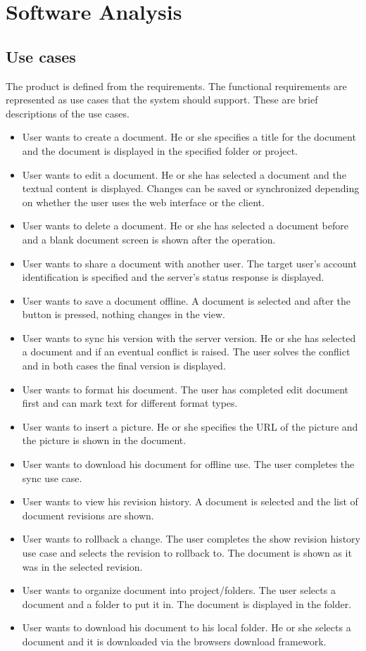 \documentclass[a4paper,11pt,report]{report}
\begin{document}
\newpage

\section{Software Analysis}
	\subsection{Use cases}
	The product is defined from the requirements. The functional requirements are represented as use cases that the system should support. These are brief descriptions of the use cases.
	\begin{itemize}
	\item User wants to create a document. He or she specifies a title for the document and the document is displayed in the specified folder or project.
	\item User wants to edit a document. He or she has selected a document and the textual content is displayed. Changes can be saved or synchronized depending on whether the user uses the web interface or the client.
	\item User wants to delete a document. He or she has selected a document before and a blank document screen is shown after the operation.
	\item User wants to share a document with another user. The target user's account identification is specified and the server's status response is displayed.
	\item User wants to save a document offline. A document is selected and after the button is pressed, nothing changes in the view.
	\item User wants to sync his version with the server version. He or she has selected a document and if an eventual conflict is raised. The user solves the conflict and in both cases the final version is displayed.
	\item User wants to format his document. The user has completed edit document first and can mark text for different format types.
	\item User wants to insert a picture. He or she specifies the URL of the picture and the picture is shown in the document.
	\item User wants to  download his document for offline use. The user completes the sync use case.
	\item User wants to view his revision history. A document is selected and the list of document revisions are shown.
	\item User wants to rollback a change. The user completes the show revision history use case and selects the revision to rollback to. The document is shown as it was in the selected revision.
	\item User wants to organize document into project/folders. The user selects a document and a folder to put it in. The document is displayed in the folder.
	\item User wants to download his document to his local folder. He or she selects a document and it is downloaded via the browsers download framework.
	\end{itemize}
\end{document}
